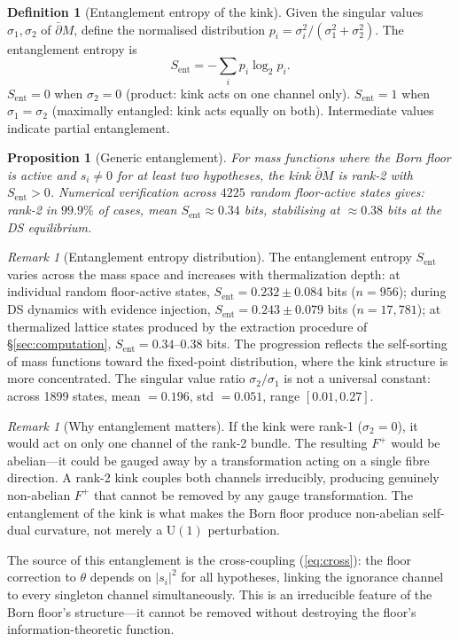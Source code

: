 \documentclass[11pt,a4paper]{article}
\newtheorem{proposition}[theorem]{Proposition}
\theoremstyle{definition}
\newtheorem{definition}[theorem]{Definition}
\theoremstyle{remark}
\newtheorem{remark}[theorem]{Remark}
\newcommand{\dbar}{\bar{\partial}}
\begin{document}
\begin{definition}[Entanglement entropy of the kink]\label{def:ent}
Given the singular values $\sigma_1,\sigma_2$ of $\dbar M$, define the normalised distribution $p_i=\sigma_i^2/(\sigma_1^2+\sigma_2^2)$. The entanglement entropy is
\begin{equation}\label{eq:ent}
S_{\mathrm{ent}} = -\sum_i p_i\log_2 p_i.
\end{equation}
$S_{\mathrm{ent}}=0$ when $\sigma_2=0$ (product: kink acts on one channel only). $S_{\mathrm{ent}}=1$ when $\sigma_1=\sigma_2$ (maximally entangled: kink acts equally on both). Intermediate values indicate partial entanglement.
\end{definition}

\begin{proposition}[Generic entanglement]\label{prop:generic_ent}
For mass functions where the Born floor is active and $s_i\neq 0$ for at least two hypotheses, the kink $\dbar M$ is rank-2 with $S_{\mathrm{ent}}>0$. Numerical verification across $4225$ random floor-active states gives: rank-2 in $99.9\%$ of cases, mean $S_{\mathrm{ent}}\approx 0.34$ bits, stabilising at $\approx 0.38$ bits at the DS equilibrium.
\end{proposition}

\begin{remark}[Entanglement entropy distribution]\label{rem:ent_distribution}
The entanglement entropy $S_{\mathrm{ent}}$ varies across the mass space and increases with thermalization depth: at individual random floor-active states, $S_{\mathrm{ent}}=0.232\pm 0.084$ bits ($n=956$); during DS dynamics with evidence injection, $S_{\mathrm{ent}}=0.243\pm 0.079$ bits ($n=17{,}781$); at thermalized lattice states produced by the extraction procedure of \S\ref{sec:computation}, $S_{\mathrm{ent}}=0.34$--$0.38$ bits. The progression reflects the self-sorting of mass functions toward the fixed-point distribution, where the kink structure is more concentrated. The singular value ratio $\sigma_2/\sigma_1$ is not a universal constant: across 1899 states, mean $=0.196$, std $=0.051$, range $[0.01, 0.27]$.
\end{remark}

\begin{remark}[Why entanglement matters]\label{rem:ent_matters}
If the kink were rank-1 ($\sigma_2=0$), it would act on only one channel of the rank-2 bundle. The resulting $F^+$ would be abelian---it could be gauged away by a transformation acting on a single fibre direction. A rank-2 kink couples both channels irreducibly, producing genuinely non-abelian $F^+$ that cannot be removed by any gauge transformation. The entanglement of the kink is what makes the Born floor produce non-abelian self-dual curvature, not merely a $\mathrm{U}(1)$ perturbation.

The source of this entanglement is the cross-coupling (\ref{eq:cross}): the floor correction to $\theta$ depends on $|s_i|^2$ for all hypotheses, linking the ignorance channel to every singleton channel simultaneously. This is an irreducible feature of the Born floor's structure---it cannot be removed without destroying the floor's information-theoretic function.
\end{remark}
\end{document}
